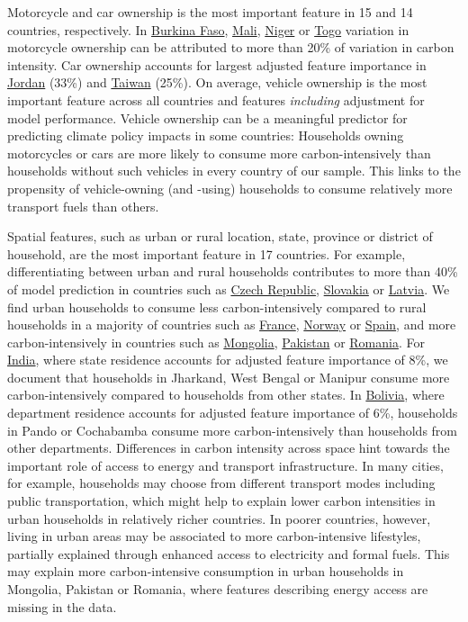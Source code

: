 \documentclass[12pt, a4paper]{article}
\begin{document}
Motorcycle and car ownership is the most important feature in 15 and 14 countries, respectively. In \hyperref[fig:5b_BFA]{Burkina Faso}, \hyperref[fig:5b_MLI]{Mali}, \hyperref[fig:5b_NER]{Niger} or \hyperref[fig:5b_TGO]{Togo} variation in motorcycle ownership can be attributed to more than 20\% of variation in carbon intensity. Car ownership accounts for largest adjusted feature importance in \hyperref[fig:5b_JOR]{Jordan} (33\%) and \hyperref[fig:5b_TWN]{Taiwan} (25\%). On average, vehicle ownership is the most important feature across all countries and features \textit{including} adjustment for model performance. Vehicle ownership can be a meaningful predictor for predicting climate policy impacts in some countries: Households owning motorcycles or cars are more likely to consume more carbon-intensively than households without such vehicles in every country of our sample. This links to the propensity of vehicle-owning (and -using) households to consume relatively more transport fuels than others.

Spatial features, such as urban or rural location, state, province or district of household, are the most important feature in 17 countries. For example, differentiating between urban and rural households contributes to more than 40\% of model prediction in countries such as \hyperref[fig:5b_CZE]{Czech Republic}, \hyperref[fig:5b_SVK]{Slovakia} or \hyperref[fig:5b_LVA]{Latvia}. We find urban households to consume less carbon-intensively compared to rural households in a majority of countries such as \hyperref[fig:5b_FRA]{France}, \hyperref[fig:5b_NOR]{Norway} or \hyperref[fig:5b_ESP]{Spain}, and more carbon-intensively in countries such as \hyperref[fig:5b_MNG]{Mongolia}, \hyperref[fig:5b_PAK]{Pakistan} or \hyperref[fig:5b_ROU]{Romania}. For \hyperref[fig:5b_IND]{India}, where state residence accounts for adjusted feature importance of 8\%, we document that households in Jharkand, West Bengal or Manipur consume more carbon-intensively compared to households from other states. In \hyperref[fig:5b_BOL]{Bolivia}, where department residence accounts for adjusted feature importance of 6\%, households in Pando or Cochabamba consume more carbon-intensively than households from other departments. Differences in carbon intensity across space hint towards the important role of access to energy and transport infrastructure. In many cities, for example, households may choose from different transport modes including public transportation, which might help to explain lower carbon intensities in urban households in relatively richer countries. In poorer countries, however, living in urban areas may be associated to more carbon-intensive lifestyles, partially explained through enhanced access to electricity and formal fuels. This may explain more carbon-intensive consumption in urban households in Mongolia, Pakistan or Romania, where features describing energy access are missing in the data.
\end{document}
